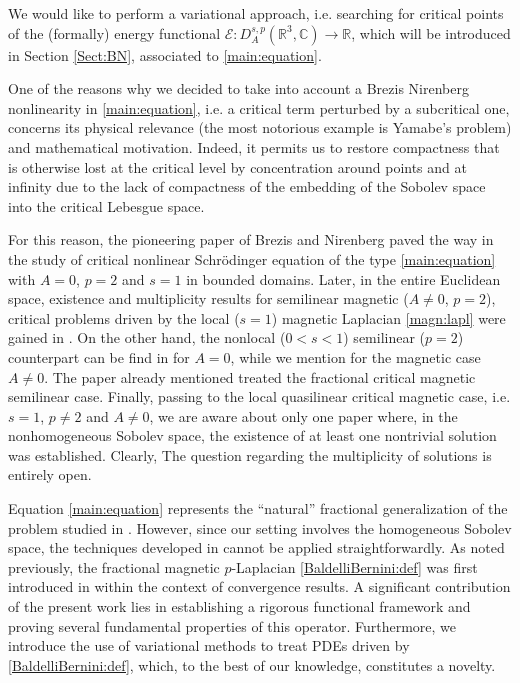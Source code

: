 \documentclass[leqno,11pt]{amsart}
\newcommand{\R}{\mathbb R}
\newcommand{\CC}{\mathbb C}
\newcommand{\cE}{{\mathcal E}}
\numberwithin{equation}{section}
\begin{document}
We would like to perform a variational approach, i.e. searching for critical points of the (formally) energy functional $\cE:D^{s,p}_A(\R^3,\CC) \to \R$, which will be introduced in Section \ref{Sect:BN}, associated to \eqref{main:equation}.

One of the reasons why we decided to take into account a Brezis Nirenberg nonlinearity in \eqref{main:equation}, i.e. a critical term perturbed by a subcritical one, concerns its physical relevance (the most notorious example is Yamabe’s problem) and mathematical motivation. Indeed, it permits us to restore compactness that is otherwise lost at the critical level by concentration around points and at infinity due to the lack of 
compactness of the embedding of the Sobolev space into the critical Lebesgue space.

For this reason, the pioneering paper of Brezis and Nirenberg \cite{bn} paved the way in the study of critical nonlinear Schr\"odinger equation of the type \eqref{main:equation} with $A=0$, $p=2$ and $s=1$ in bounded domains. Later, in the entire Euclidean space, existence and multiplicity results for semilinear magnetic ($A\neq 0$, $p=2$), critical problems driven by the local ($s=1$) magnetic Laplacian \eqref{magn:lapl} were gained in \cite{ArioliSzulkin2003, chabszulkin, Ambrosio_schrodinger}. On the other hand, the nonlocal ($0<s<1$) semilinear ($p=2$) counterpart can be find in \cite{MosconiPereraSquassinaYang} for $A=0$, while we mention \cite{BSX, Ambrosio_kirchhoff, Ambrosio2020-3, YangAn} for the magnetic case $A\neq0$. The paper already mentioned \cite{dAveniaSquassina} treated the fractional critical magnetic semilinear case. Finally, passing to the local quasilinear critical magnetic case, i.e. $s=1$, $p\neq 2$ and $A\neq 0$, we are aware about only one paper \cite{bfk} where, in the nonhomogeneous Sobolev space, the existence of at least one nontrivial solution was established. Clearly, The question regarding the multiplicity of solutions is entirely open. 

Equation \eqref{main:equation} represents the ``natural'' fractional generalization of the problem studied in \cite{bfk}. However, since our  setting involves the homogeneous Sobolev space, the techniques developed  in \cite{bfk} cannot be applied straightforwardly. As noted previously, the fractional magnetic $p$-Laplacian \eqref{BaldelliBernini:def} was first introduced in \cite{npsv, NguyenPinamontiSquassinaVecchi_2018} within the context of convergence results. A significant contribution of the present work lies in establishing a rigorous functional framework and proving several fundamental properties of this operator. Furthermore, we introduce the use of variational methods to treat PDEs driven by \eqref{BaldelliBernini:def}, which, to the best of our knowledge, constitutes a novelty.
\end{document}
